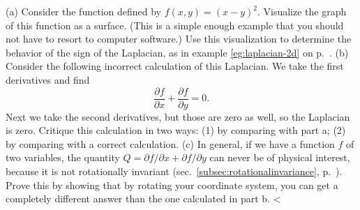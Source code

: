 (a) Consider the function defined by $f(x,y)=(x-y)^2$. Visualize the graph
of this function as a surface. (This is a simple enough example that you
should not have to resort to computer software.)  Use this visualization to
determine the behavior of the sign of the Laplacian, as in 
example \ref{eg:laplacian-2d} on p.~\pageref{eg:laplacian-2d}.\hwendpart
(b) Consider the following incorrect calculation of this Laplacian. We take
the first derivatives and find
\begin{equation*}
  \frac{\partial f}{\partial x}+\frac{\partial f}{\partial y} = 0.
\end{equation*}
Next we take the second derivatives, but those are zero as well, so the
Laplacian is zero.
Critique this calculation in two ways: (1) by comparing with part a;
(2) by comparing with a correct calculation.\hwendpart
(c) In general, if we have a function $f$ of two variables, the quantity
$Q=\partial f/\partial x+\partial f/\partial y$ can never be of physical
interest, because it is not rotationally invariant (sec.~\ref{subsec:rotationalinvariance},
p.~\pageref{subsec:rotationalinvariance}). Prove this by showing that by rotating your
coordinate system, you can get a completely different answer than the
one calculated in part b.
<%

